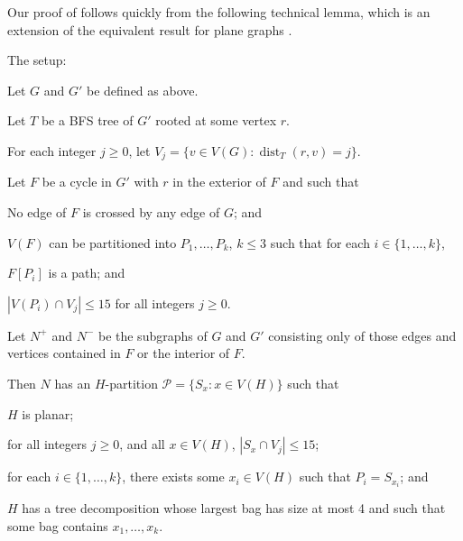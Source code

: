 \documentclass{patmorin}
\DeclareMathOperator{\dist}{dist}
\begin{document}
Our proof of  follows quickly from the following technical lemma, which is an extension of the equivalent result for plane graphs \cite{dujmovic.joret.ea:planar}.
\begin{lem} The setup:
  \begin{compactenum}
    \item Let $G$ and $G'$ be defined as above.
    \item Let $T$ be a BFS tree of $G'$ rooted at some vertex $r$.
    \item For each integer $j\ge 0$, let $V_j=\{v\in V(G):\dist_T(r,v)=j\}$. 
    \item Let $F$ be a cycle in $G'$ with $r$ in the exterior of $F$ and such that
    \begin{compactenum} 
      \item No edge of $F$ is crossed by any edge of $G$; and
      \item $V(F)$ can be partitioned into $P_1,\ldots,P_k$, $k\le 3$ such that for each $i\in\{1,\ldots,k\}$,
      \begin{compactenum}
        \item $F[P_i]$ is a path; and
        \item $|V(P_i)\cap V_j| \le 15$ for all integers $j\ge 0$.
      \end{compactenum}
    \end{compactenum}
    \item Let $N^+$ and $N^-$ be the subgraphs of $G$ and $G'$ consisting only of those edges and vertices contained in $F$ or the interior of $F$.
  \end{compactenum}
  Then $N$ has an $H$-partition $\mathcal{P}=\{S_x : x\in V(H)\}$ such that
  \begin{compactenum}
    \item $H$ is planar;
    \item for all integers $j\ge 0$, and all $x\in V(H)$, $|S_x\cap V_j|\le 15$; 
    \item for each $i\in\{1,\ldots,k\}$, there exists some $x_i\in V(H)$ such that $P_i=S_{x_i}$; and
    \item $H$ has a tree decomposition whose largest bag has size at most 4 and such that some bag contains $x_1,\ldots,x_k$.
  \end{compactenum}
\end{lem}
\end{document}
